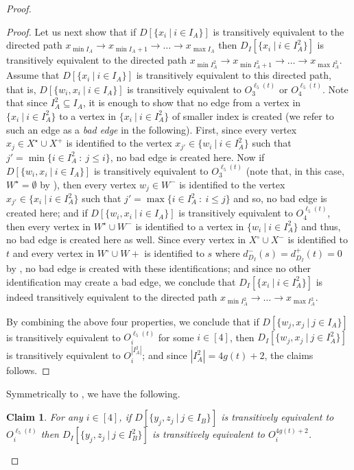 \documentclass[a4paper,11pt]{article}
\theoremstyle{plain}
\newtheorem{claim}[theorem]{Claim}
\newtheorem{identification rule}{Identification Rule}
\theoremstyle{definition}
\theoremstyle{remark}
\newenvironment{claimproof}{\begin{proof}\renewcommand{\qedsymbol}{\claimqed}}{\end{proof}\renewcommand{\qedsymbol}{\plainqed}}
\let\plainqed\qedsymbol
\newcommand{\claimqed}{$\lrcorner$}
\begin{document}
\begin{proof}
\begin{claimproof}
Let us next show that if $D[\{x_i~|~i \in I_A\}]$ is transitively equivalent to the directed path 
$x_{\min I_A} \rightarrow x_{\min I_A +1} \rightarrow \ldots \rightarrow x_{\max I_A}$ then
$D_I[\{x_i~|~i \in I_A^2\}]$ is transitively equivalent to the directed path 
$x_{\min I_A^2} \rightarrow x_{\min I_A^2 +1} \rightarrow \ldots \rightarrow x_{\max I_A^2}$.
Assume that $D[\{x_i~|~i \in I_A\}]$ is transitively equivalent to this directed path, that is,
$D[\{w_i,x_i~|~i \in I_A\}]$ is transitively equivalent to $O_3^{\ell_5(t)}$ or $O_4^{\ell_5(t)}$.
Note that since $I_A^2 \subseteq I_A$, it is enough to show that no edge from a vertex in $\{x_i~|~i \in I_A^2\}$ to a vertex in $\{x_i~|~i \in I_A^2\}$ of smaller index is created (we refer to such an edge as a \emph{bad edge} in the following).
First, since every vertex $x_j \in X^\star \cup X^+$ is identified to the vertex $x_{j'} \in \{w_i~|~i \in I_A^2\}$ such that $j' = \min \{i \in I_A^2~:~ j \leq i\}$, no bad edge is created here. 
Now if $D[\{w_i,x_i~|~i \in I_A\}]$ is transitively equivalent to $O_3^{\ell_5(t)}$ (note that, in this case, $W^\star = \emptyset$ by ), then every vertex $w_j \in W^-$ is identified to the vertex $x_{j'} \in \{x_i~|~i \in I_A^2\}$ such that $j' = \max \{i \in I_A^2~:~i \leq j\}$ and so, no bad edge is created here; and if $D[\{w_i,x_i~|~i \in I_A\}]$ is transitively equivalent to $O_4^{\ell_5(t)}$, then every vertex in $W^\star \cup W^-$ is identified to a vertex in $\{w_i~|~i \in I_A^2\}$ and thus, no bad edge is created here as well. 
Since every vertex in $X^\circ \cup X^-$ is identified to $t$ and every vertex in $W^\circ \cup W+$ is identified to $s$ where $d^-_{D_I}(s) = d^+_{D_I}(t) = 0$ by , no bad edge is created with these identifications;
and since no other identification may create a bad edge, we conclude that $D_I[\{x_i~|~i \in I_A^2\}]$ is indeed transitively equivalent to the directed path $x_{\min I_A^2} \rightarrow \ldots \rightarrow x_{\max I_A^2}$.

By combining the above four properties, we conclude that if $D[\{w_j,x_j~|~j\in I_A\}]$ is transitively equivalent to $O_i^{\ell_5(t)}$ for some $i \in [4]$, then
$D_I[\{w_j,x_j~|~j \in I_A^2\}]$ is transitively equivalent to $O_i^{|I_A^2|}$; and since $|I_A^2| = 4g(t) + 2$, the claims follows.
\end{claimproof}

Symmetrically to , we have the following.

\begin{claim}
\label{clm:sameinDIYZ}
For any $i \in [4]$, if $D[\{y_j,z_j~|~j\in I_B\}]$ is transitively equivalent to $O_i^{\ell_5(t)}$ then
$D_I[\{y_j,z_j~|~j \in I_B^2\}]$ is transitively equivalent to $O_i^{4g(t)+2}$.
\end{claim}


\end{proof}
\end{document}
